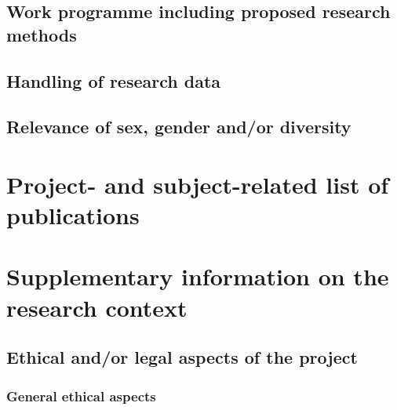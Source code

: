 \documentclass[12pt]{scrartcl}
\begin{document}
\subsection{Work programme including proposed research methods}

\subsection{Handling of research data}

\subsection{Relevance of sex, gender and/or diversity}

\section{Project- and subject-related list of publications}
\vspace{-0.5cm}
\begingroup
\begin{multicols}{2}
\setlength{\parskip}{\bibitemsep}%
\renewcommand{\section}[2]{}
\printbibliography
\end{multicols}
\endgroup



\newpage
\section{Supplementary information on the research context}

\subsection{Ethical and/or legal aspects of the project}

\subsubsection{General ethical aspects}
\end{document}
